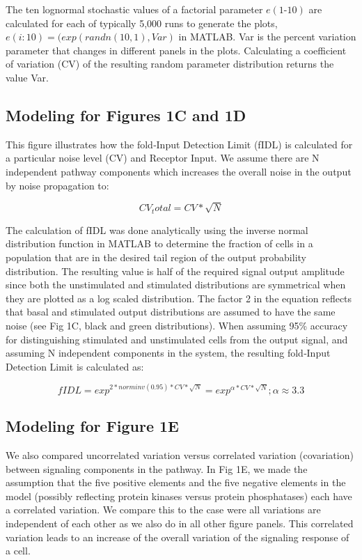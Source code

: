 The ten lognormal stochastic values of a factorial parameter $e(1‐10)$ are calculated for each of typically 5,000 runs to generate the plots, $e(i:10)=(exp(randn(10,1), Var)$ in MATLAB. Var is the percent variation parameter that changes in different panels in the plots. Calculating a coefficient of variation (CV) of the resulting random parameter distribution returns the value Var.

\subsection{Modeling for Figures 1C and 1D}

This figure illustrates how the fold‐Input Detection Limit (fIDL) is calculated for a particular noise level (CV) and Receptor Input. We assume there are N independent pathway components which increases the overall noise in the output by noise propagation to:

\begin{equation}\label{paper1_eq7}
CV_total = CV * \sqrt{N}
\end{equation}

The calculation of fIDL was done analytically using the inverse normal distribution function in MATLAB to determine the fraction of cells in a population that are in the desired tail region of the output probability distribution. The resulting value is half of the required signal output amplitude since both the unstimulated and stimulated distributions are symmetrical when they are plotted as a log scaled distribution. The factor 2 in the equation reflects that basal and stimulated output distributions are assumed to have the same noise (see Fig 1C, black and green distributions). When assuming 95\% accuracy for distinguishing stimulated and unstimulated cells from the output signal, and assuming N independent components in the system, the resulting fold‐Input Detection Limit is calculated as:

\begin{equation}\label{paper1_eq8}
fIDL = exp^{2 * norminv(0.95) * CV * \sqrt{N}} = exp^{\alpha * CV * \sqrt{N}} ; \alpha \approx 3.3
\end{equation}

\subsection{Modeling for Figure 1E}

We also compared uncorrelated variation versus correlated variation (covariation) between signaling components in the pathway. In Fig 1E, we made the assumption that the five positive elements and the five negative elements in the model (possibly reflecting protein kinases versus protein phosphatases) each have a correlated variation. We compare this to the case were all variations are independent of each other as we also do in all other figure panels. This correlated variation leads to an increase of the overall variation of the signaling response of a cell.

